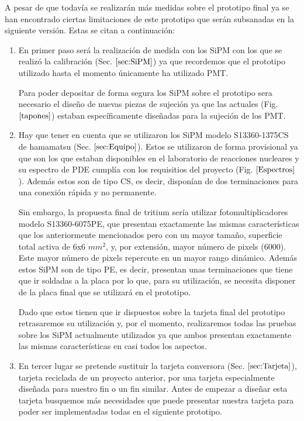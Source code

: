 A pesar de que todavía se realizarán más medidas sobre el prototipo final ya se han encontrado ciertas limitaciones de este prototipo que serán subsanadas  en la siguiente versión. Estas se citan a continuación:
\begin{enumerate}
\item{} En primer paso será la realización de medida con los SiPM con los que se realizó la calibración (Sec. $\ref{sec:SiPM}$) ya que recordemos que el prototipo utilizado hasta el momento únicamente ha utilizado PMT. 

Para poder depositar de forma segura los SiPM sobre el prototipo sera necesario el diseño de nuevas piezas de sujeción ya que las actuales (Fig. $\ref{tapones}$) estaban específicamente diseñadas para la sujeción de los PMT.

\item{} Hay que tener en cuenta que se utilizaron los SiPM modelo S13360-1375CS de hamamatsu (Sec. $\ref{sec:Equipo}$). Estos se utilizaron de forma provisional ya que son los que estaban disponibles en el laboratorio de reacciones nucleares y su espectro de PDE cumplía con los requisitios del proyecto (Fig. $\ref{Espectros}$). Además estos son de tipo CS, es decir, disponían de dos terminaciones para una conexión rápida y no permanente. 

Sin embargo, la propuesta final de tritium sería utilizar fotomultiplicadores modelo S13360-6075PE,  que presentan exactamente las mismas características que los anteriormente mencionados pero con un mayor tamaño, superficie total activa de 6x6 $mm^2$, y, por extensión, mayor número de pixels (6000). Este mayor número de pixels repercute en un mayor rango dinámico. Además estos SiPM son de tipo PE, es decir, presentan unas terminaciones que tiene que ir soldadas a la placa por lo que, para su utilización, se necesita disponer de la placa final que se utilizará en el prototipo. 

Dado que estos tienen que ir dispuestos sobre la tarjeta final del prototipo retrasaremos su utilización y, por el momento, realizaremos todas las pruebas sobre los SiPM actualmente utilizados ya que ambos presentan exactamente las mismas características en casi todos los aspectos.

\item{} En tercer lugar se pretende sustituir la tarjeta conversora (Sec. $\ref{sec:Tarjeta}$), tarjeta reciclada de un proyecto anterior, por una tarjeta especialmente diseñada para nuestro fin o un fin similar. Antes de empezar a diseñar esta tarjeta busquemos más necesidades que puede presentar nuestra tarjeta para poder ser implementadas todas en el siguiente prototipo.


\end{enumerate}
